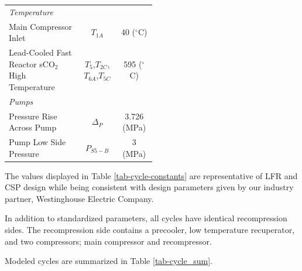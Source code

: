 \begin{paracol}{2}
\begin{specialtable}[H]
\begin{tabular}{L{0.5\linewidth}cc}
    \textit{Temperature}\\
    Main Compressor Inlet & $T_{1A}$ & 40 ($^{\circ}$C)\\
    Lead-Cooled Fast Reactor sCO$_{2}$ High Temperature & $T_{5}$,$T_{2C}$,$T_{6A}$,$T_{5C}$ & 595 ($^{\circ}$C)\\
    \midrule
    \textit{Pumps}\\
    Pressure Rise Across Pump & $\Delta_{P}$ & 3.726 (MPa)\\
    Pump Low Side Pressure & $P_{S5-B}$ & 3 (MPa)\\ 
    \bottomrule
    \end{tabular}
\end{specialtable}

The values displayed in Table \ref{tab-cycle-constants} are representative of LFR and CSP design while being consistent with design parameters given by our industry partner, Westinghouse Electric Company. 


In addition to standardized parameters, all cycles have identical recompression sides. The recompression side contains a precooler, low temperature recuperator, and two compressors; main compressor and recompressor. 

Modeled cycles are summarized in Table \ref{tab-cycle_sum}.


\end{paracol}
